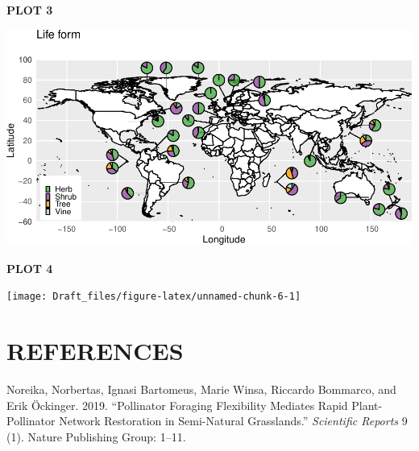 \documentclass[12pt,]{article}
\begin{document}
\newpage

\textbf{PLOT 3}

\begin{center}\includegraphics{Draft_files/figure-latex/unnamed-chunk-5-1} \end{center}

\newpage

\textbf{PLOT 4}

\begin{center}\texttt{[image: Draft\_files/figure-latex/unnamed-chunk-6-1]} \end{center}

\section*{REFERENCES}\label{references}

\hypertarget{refs}{}
\hypertarget{ref-noreika2019pollinator}{}
Noreika, Norbertas, Ignasi Bartomeus, Marie Winsa, Riccardo Bommarco,
and Erik Öckinger. 2019. ``Pollinator Foraging Flexibility Mediates
Rapid Plant-Pollinator Network Restoration in Semi-Natural Grasslands.''
\emph{Scientific Reports} 9 (1). Nature Publishing Group: 1--11.
\end{document}
